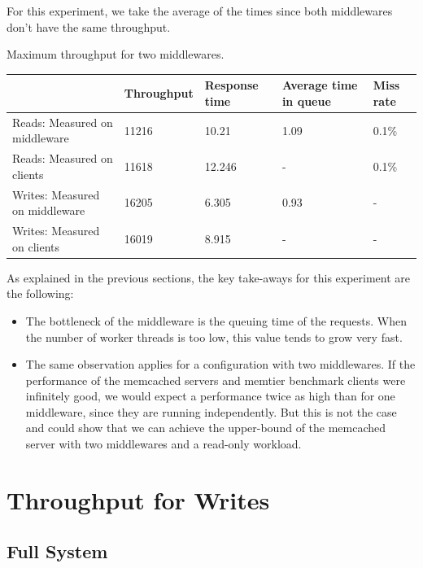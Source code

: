 \documentclass[11pt,a4paper]{article}
\begin{document}
For this experiment, we take the average of the times since both middlewares don't have the same throughput. 
\begin{center}
	{Maximum throughput for two middlewares.}
	\begin{tabular}{|l|p{2cm}|p{2cm}|p{2cm}|p{2cm}|}
		\hline                                & Throughput & Response time & Average time in queue & Miss rate \\ 
		\hline Reads: Measured on middleware  &11216            &10.21               &1.09                       &0.1\%           \\
		\hline Reads: Measured on clients     & 11618            &12.246               &-                   &0.1\%           \\ 
		\hline Writes: Measured on middleware &16205            &6.305               &0.93                       &-       \\ 
		\hline Writes: Measured on clients    &16019            &8.915               &-                   &-       \\ 
		\hline 
	\end{tabular}
\end{center}

As explained in the previous sections, the key take-aways for this experiment are the following:

\begin{itemize}
\item The bottleneck of the middleware is the queuing time of the requests. When the number of worker threads is too low, this value tends to grow very fast.  
\item The same observation applies for a configuration with two middlewares. If the performance of the memcached servers and memtier benchmark clients were infinitely good, we would expect a performance twice as high than for one middleware, since they are running independently. But this is not the case and could show that we can achieve the upper-bound of the memcached server with two middlewares and a read-only workload. 
\end{itemize}
\newpage

\section{Throughput for Writes}

\subsection{Full System}
\end{document}
